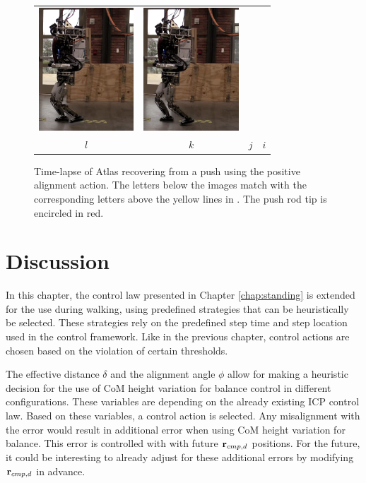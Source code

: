 \begin{figure}
\begin{tabular}{cccc}
    \includegraphics[width=1.4in]{STYLESTUFF/atw10} &
    \includegraphics[width=1.4in]{STYLESTUFF/atw9} \\
    $l$ & $k$ & $j$ & $i$ 
  \end{tabular}
  \caption{Time-lapse of Atlas recovering from a push using the positive alignment action. The letters below the images match with the corresponding letters above the yellow lines in . The push rod tip is encircled in red.}
  \label{fig:atw}
\end{figure}
\section{Discussion}
In this chapter, the control law presented in Chapter \ref{chap:standing} is extended for the use during walking, using predefined strategies that can be heuristically be selected. These strategies rely on the predefined step time and step location used in the control framework. Like in the previous chapter, control actions are chosen based on the violation of certain thresholds. 

The effective distance $\delta$ and the alignment angle $\phi$ allow for making a heuristic decision for the use of \ac{CoM} height variation for balance control in different configurations. These variables are depending on the already existing \ac{ICP} control law. Based on these variables, a control action is selected. Any misalignment with the error would result in additional error when using \ac{CoM} height variation for balance. This error is controlled with with future $\mathbf{r}_{cmp,d}$ positions. For the future, it could be interesting to already adjust for these additional errors by modifying $\mathbf{r}_{cmp,d}$ in advance.

